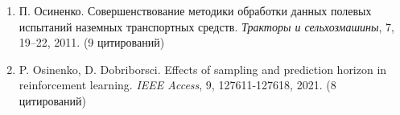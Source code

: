 \documentclass{article}
\begin{document}
\begin{enumerate}
\item П. Осиненко. Совершенствование методики обработки данных полевых испытаний наземных транспортных средств. \textit{Тракторы и сельхозмашины}, 7, 19--22, 2011. (9 цитирований)

\item P. Osinenko, D. Dobriborsci. Effects of sampling and prediction horizon in reinforcement learning. \textit{IEEE Access}, 9, 127611-127618, 2021. (8 цитирований)

\end{enumerate}

\end{document}

